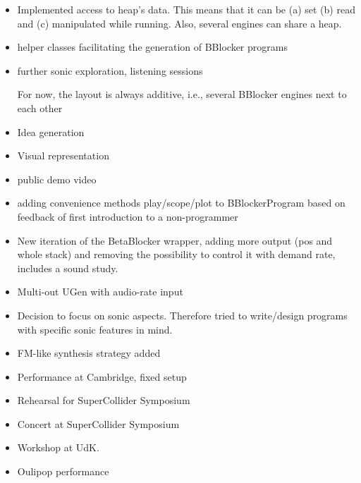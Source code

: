 \documentclass[letterpaper, 12pt]{article}
\begin{document}
\begin{itemize}	 
\item Implemented access to heap's data. This means that it can be (a) set (b) read and (c) manipulated while running. Also, several engines can share a heap. 
\item helper classes facilitating the generation of BBlocker programs 
\item further sonic exploration, listening sessions 

	For now, the layout is always additive, i.e., several BBlocker engines next to each other

\item Idea generation
\item Visual representation
\item public demo video
\item adding convenience methods play/scope/plot to BBlockerProgram based on feedback of first introduction to a non-programmer
\item New iteration of the BetaBlocker wrapper, adding more output (pos and whole stack) and removing the possibility to control it with demand rate,
	includes a sound study.
\item Multi-out UGen with audio-rate input
\item Decision to focus on sonic aspects. Therefore tried to write/design programs with specific sonic features in mind.
\item FM-like synthesis strategy added
\item Performance at Cambridge, fixed setup
\item Rehearsal for SuperCollider Symposium
\item Concert at SuperCollider Symposium
\item Workshop at UdK.
\item Oulipop performance
\end{itemize}
\end{document}
